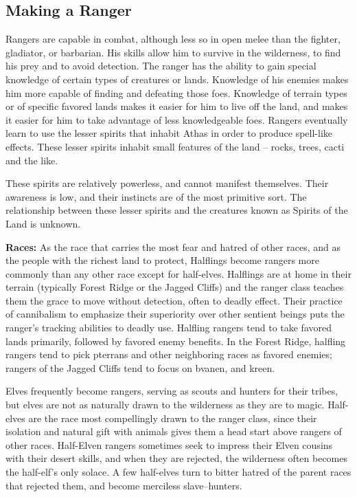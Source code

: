 \subsection{Making a Ranger}
Rangers are capable in combat, although less so in open melee than the fighter, gladiator, or barbarian. His skills allow him to survive in the wilderness, to find his prey and to avoid detection. The ranger has the ability to gain special knowledge of certain types of creatures or lands. Knowledge of his enemies makes him more capable of finding and defeating those foes. Knowledge of terrain types or of specific favored lands makes it easier for him to live off the land, and makes it easier for him to take advantage of less knowledgeable foes. Rangers eventually learn to use the lesser spirits that inhabit Athas in order to produce spell-like effects. These lesser spirits inhabit small features of the land -- rocks, trees, cacti and the like.

These spirits are relatively powerless, and cannot manifest themselves. Their awareness is low, and their instincts are of the most primitive sort. The relationship between these lesser spirits and the creatures known as Spirits of the Land is unknown.

\textbf{Races:} As the race that carries the most fear and hatred of other races, and as the people with the richest land to protect, Halflings become rangers more commonly than any other race except for half-elves. Halflings are at home in their terrain (typically Forest Ridge or the Jagged Cliffs) and the ranger class teaches them the grace to move without detection, often to deadly effect. Their practice of cannibalism to emphasize their superiority over other sentient beings puts the ranger's tracking abilities to deadly use. Halfling rangers tend to take favored lands primarily, followed by favored enemy benefits. In the Forest Ridge, halfling rangers tend to pick pterrans and other neighboring races as favored enemies; rangers of the Jagged Cliffs tend to focus on bvanen, and kreen.

Elves frequently become rangers, serving as scouts and hunters for their tribes, but elves are not as naturally drawn to the wilderness as they are to magic. Half-elves are the race most compellingly drawn to the ranger class, since their isolation and natural gift with animals gives them a head start above rangers of other races. Half-Elven rangers sometimes seek to impress their Elven cousins with their desert skills, and when they are rejected, the wilderness often becomes the half-elf's only solace. A few half-elves turn to bitter hatred of the parent races that rejected them, and become merciless slave--hunters.


